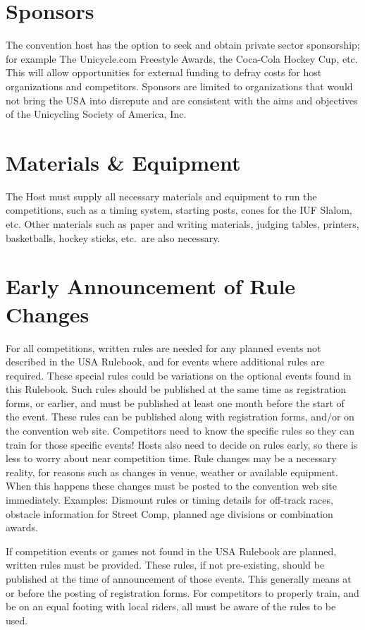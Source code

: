 \section{Sponsors}

The convention host has the option to seek and obtain private sector sponsorship; for example The Unicycle.com Freestyle Awards, the Coca-Cola Hockey Cup, etc.
This will allow opportunities for external funding to defray costs for host organizations and competitors.
Sponsors are limited to organizations that would not bring the USA into disrepute and are consistent with the aims and objectives of the Unicycling Society of America, Inc.

\section{Materials \& Equipment}
The Host must supply all necessary materials and equipment to run the competitions, such as a timing system, starting posts, cones for the IUF Slalom, etc.
Other materials such as paper and writing materials, judging tables, printers, basketballs, hockey sticks, etc.\ are also necessary.

\section{Early Announcement of Rule Changes}
For all competitions, written rules are needed for any planned events not described in the USA Rulebook, and for events where additional rules are required.
These special rules could be variations on the optional events found in this Rulebook.
Such rules should be published at the same time as registration forms, or earlier, and must be published at least one month before the start of the event.
These rules can be published along with registration forms, and/or on the convention web site.
Competitors need to know the specific rules so they can train for those specific events!
Hosts also need to decide on rules early, so there is less to worry about near competition time.
Rule changes may be a necessary reality, for reasons such as changes in venue, weather or available equipment.
When this happens these changes must be posted to the convention web site immediately.
Examples: Dismount rules or timing details for off-track races, obstacle information for Street Comp, planned age divisions or combination awards.

If competition events or games not found in the USA Rulebook are planned, written rules must be provided.
These rules, if not pre-existing, should be published at the time of announcement of those events.
This generally means at or before the posting of registration forms.
For competitors to properly train, and be on an equal footing with local riders, all must be aware of the rules to be used.

